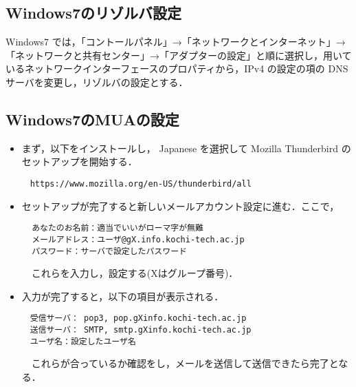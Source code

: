 \documentclass[a4j,titlepage]{jarticle}
\begin{document}
\subsection{Windows7のリゾルバ設定}
Windows7 では，「コントールパネル」→「ネットワークとインターネット」→「ネットワークと共有センター」→「アダプターの設定」と順に選択し，用いているネットワークインターフェースのプロパティから，IPv4 の設定の項の DNS サーバを変更し，リゾルバの設定とする．

\subsection{Windows7のMUAの設定}
\begin{itemize}
\item まず，以下をインストールし， Japanese を選択して Mozilla Thunderbird のセットアップを開始する．
  \begin{center}
    \begin{screen}
\begin{verbatim}
　https://www.mozilla.org/en-US/thunderbird/all 
\end{verbatim}
    \end{screen}
  \end{center}

\item セットアップが完了すると新しいメールアカウント設定に進む．ここで，
  \begin{center}
    \begin{screen}
\begin{verbatim}
  あなたのお名前：適当でいいがローマ字が無難
  メールアドレス：ユーザ@gX.info.kochi-tech.ac.jp
  パスワード：サーバで設定したパスワード
\end{verbatim}
    \end{screen}
  \end{center}

　これらを入力し，設定する(Xはグループ番号)．

\item 入力が完了すると，以下の項目が表示される．
  \begin{center}
    \begin{screen}
\begin{verbatim}
　受信サーバ： pop3, pop.gXinfo.kochi-tech.ac.jp
　送信サーバ： SMTP, smtp.gXinfo.kochi-tech.ac.jp
　ユーザ名：設定したユーザ名
\end{verbatim}
    \end{screen}
  \end{center}

　これらが合っているか確認をし，メールを送信して送信できたら完了となる．

\end{itemize}
\end{document}
